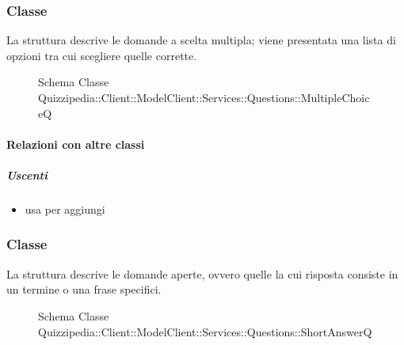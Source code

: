 \subsubsection{Classe }
La struttura descrive le domande a scelta multipla; viene presentata una lista di opzioni tra cui scegliere quelle corrette.
\begin{figure}[H]
\centering
\noindent{}
\caption[Schema Classe MultipleChoiceQ]{Schema Classe Quizzipedia::Client::ModelClient::Services::Questions::MultipleChoiceQ}
\end{figure}
\paragraph{Relazioni con altre classi}
\subparagraph{Uscenti}
\begin{itemize}
\item usa  per aggiungi
\end{itemize}
\subsubsection{Classe }
La struttura descrive le domande aperte, ovvero quelle la cui risposta consiste in un termine o una frase specifici.
\begin{figure}[H]
\centering
\noindent{}
\caption[Schema Classe ShortAnswerQ]{Schema Classe Quizzipedia::Client::ModelClient::Services::Questions::ShortAnswerQ}
\end{figure}
